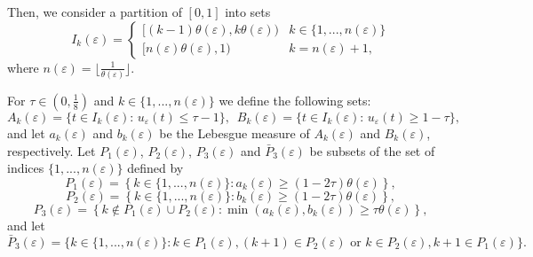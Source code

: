 \documentclass[12pt]{article}
\numberwithin{equation}{section}
\begin{document}
 Then, we consider a partition of $[0,1]$ into sets
\[
I_{k}({\varepsilon})=\begin{cases}
    [(k-1)\theta(\varepsilon),k\theta(\varepsilon)) & k\in\{1,...,n(\varepsilon)\}\\
    [n(\varepsilon)\theta(\varepsilon),1) & k=n(\varepsilon)+1,
\end{cases}
\]
where $n(\varepsilon)=\lfloor\frac{1}{\theta(\varepsilon)}\rfloor$. 

For $\tau\in(0,\frac{1}{8})$ and $k\in\{1,...,n(\varepsilon)\}$ we define the following sets:
\begin{equation*}
A_k(\varepsilon)=\big\{t\in I_{k}({\varepsilon}):\,u_{\varepsilon}(t)\le\tau-1\big\},\,\,\,B_k(\varepsilon)=\big\{t\in I_{k}({\varepsilon}):\,u_{\varepsilon}(t)\ge1-\tau\big\},
\end{equation*}
 and let $a_k(\varepsilon)$ and  $b_k(\varepsilon)$ be the Lebesgue measure of $A_k(\varepsilon)$ and $B_k(\varepsilon)$, respectively. Let $P_{1}(\varepsilon)$, $P_{2}(\varepsilon)$, $P_{3}(\varepsilon)$ and $\bar{P}_{3}(\varepsilon)$ be subsets of the set of indices $\{1,...,n(\varepsilon)\}$ defined by
    \[ 
     P_1(\varepsilon)=\left\{k\in\{1,...,n(\varepsilon)\}:a_k(\varepsilon)\ge(1-2\tau)\theta(\varepsilon)\right\},
    \]
    \[
     P_{2}(\varepsilon)=\left\{k\in\{1,...,n(\varepsilon)\}:b_k(\varepsilon)\ge(1-2\tau)\theta(\varepsilon)\right\},
    \]
    \[
     P_{3}(\varepsilon)=\left\{k\notin P_{1}(\varepsilon)\cup P_{2}(\varepsilon):\min{(a_k(\varepsilon),b_k(\varepsilon))}\ge\tau\theta(\varepsilon)\right\},
    \]
and let
\[
\bar{P}_{3}(\varepsilon)=\big\{k\in\{1,...,n(\varepsilon)\}:k\in P_{1}(\varepsilon),(k+1)\in P_{2}(\varepsilon)\,\,\text{or}\,\,k\in P_{2}(\varepsilon),k+1\in P_{1}(\varepsilon)\big\}. 
\]
\end{document}
